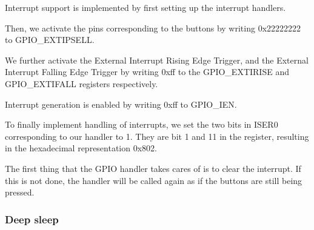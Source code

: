 Interrupt support is implemented by first setting up the interrupt handlers.

Then, we activate the pins corresponding to the buttons by writing 0x22222222 to GPIO\_EXTIPSELL.

We further activate the External Interrupt Rising Edge Trigger, and the External Interrupt Falling Edge Trigger by writing 0xff to the GPIO\_EXTIRISE and GPIO\_EXTIFALL registers respectively.

Interrupt generation is enabled by writing 0xff to GPIO\_IEN.

To finally implement handling of interrupts, we set the two bits in ISER0 corresponding to our handler to 1. They are bit 1 and 11 in the register, resulting in the hexadecimal representation 0x802.

The first thing that the GPIO handler takes cares of is to clear the interrupt. If this is not done, the handler will be called again as if the buttons are still being pressed.

\subsubsection{Deep sleep}
\label{dev_pros_deep_sleep}
